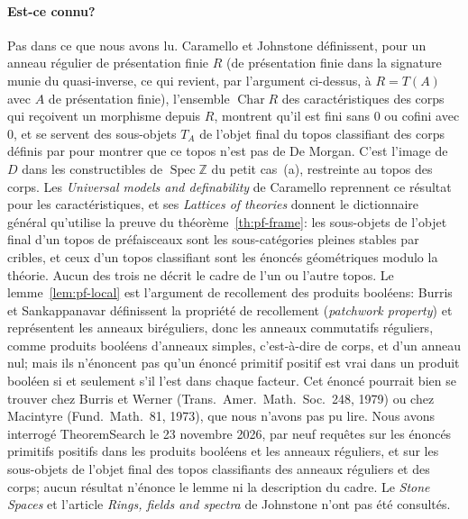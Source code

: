 \paragraph{Est-ce connu?} Pas dans ce que nous avons lu. Caramello et Johnstone \cite[p.~2 et lemmes~1.1--1.2]{caramello-johnstone} définissent, pour un anneau régulier de présentation finie $R$ (de présentation finie dans la signature munie du quasi-inverse, ce qui revient, par l'argument ci-dessus, à $R = T(A)$ avec $A$ de présentation finie), l'ensemble $\operatorname{Char}R$ des caractéristiques des corps qui reçoivent un morphisme depuis $R$, montrent qu'il est fini sans $0$ ou cofini avec $0$, et se servent des sous-objets $T_A$ de l'objet final du topos classifiant des corps définis par  pour montrer que ce topos n'est pas de De Morgan. C'est l'image de $D$ dans les constructibles de $\operatorname{Spec}\mathbb Z$ du petit cas~(a), restreinte au topos des corps. Les \emph{Universal models and definability} de Caramello \cite[\S7(ii)]{caramello-universal} reprennent ce résultat pour les caractéristiques, et ses \emph{Lattices of theories} \cite[\S7.1]{caramello-lattices} donnent le dictionnaire général qu'utilise la preuve du théorème~\ref{th:pf-frame}: les sous-objets de l'objet final d'un topos de préfaisceaux sont les sous-catégories pleines stables par cribles, et ceux d'un topos classifiant sont les énoncés géométriques modulo la théorie. Aucun des trois ne décrit le cadre de l'un ou l'autre topos. Le lemme~\ref{lem:pf-local} est l'argument de recollement des produits booléens: Burris et Sankappanavar \cite[déf.~IV.8.1 et l'exemple de Dauns et Hofmann après le cor.~IV.8.14]{burris-sankappanavar} définissent la propriété de recollement (\emph{patchwork property}) et représentent les anneaux biréguliers, donc les anneaux commutatifs réguliers, comme produits booléens d'anneaux simples, c'est-à-dire de corps, et d'un anneau nul; mais ils n'énoncent pas qu'un énoncé primitif positif est vrai dans un produit booléen si et seulement s'il l'est dans chaque facteur. Cet énoncé pourrait bien se trouver chez Burris et Werner (Trans.\ Amer.\ Math.\ Soc.\ 248, 1979) ou chez Macintyre (Fund.\ Math.\ 81, 1973), que nous n'avons pas pu lire. Nous avons interrogé TheoremSearch le 23 novembre 2026, par neuf requêtes sur les énoncés primitifs positifs dans les produits booléens et les anneaux réguliers, et sur les sous-objets de l'objet final des topos classifiants des anneaux réguliers et des corps; aucun résultat n'énonce le lemme ni la description du cadre. Le \emph{Stone Spaces} et l'article \emph{Rings, fields and spectra} de Johnstone n'ont pas été consultés.
